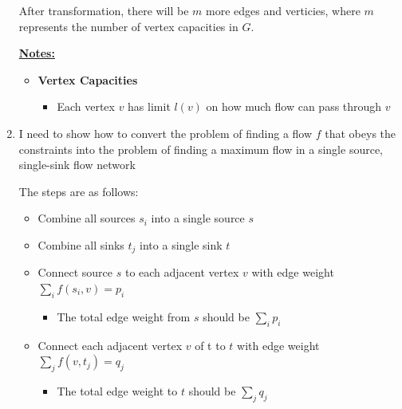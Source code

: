 \documentclass[12pt]{article}
\begin{document}
\begin{enumerate}[1.]
    \bigskip

    After transformation, there will be $m$ more edges and verticies, where $m$
    represents the number of vertex capacities in $G$.

    \bigskip

    \underline{\textbf{Notes:}}

    \bigskip

    \begin{itemize}
        \item \textbf{Vertex Capacities}
        \begin{itemize}
            \item Each vertex $v$ has limit $l(v)$ on how much flow can pass through $v$
        \end{itemize}
    \end{itemize}

    \item

    \bigskip

    I need to show how to convert the problem of finding a flow $f$ that obeys the
    constraints into the problem of finding a maximum flow in a single
    source, single-sink flow network

    \bigskip

    The steps are as follows:

    \bigskip

    \begin{itemize}
        \item Combine all sources $s_i$ into a single source $s$
        \item Combine all sinks $t_j$ into a single sink $t$
        \item Connect source $s$ to each adjacent vertex $v$ with edge weight $\sum\limits_{i} f(s_i, v) = p_i$

        \begin{itemize}
            \item The total edge weight from $s$ should be $\sum\limits_{i} p_i$
        \end{itemize}

        \item Connect each adjacent vertex $v$ of t to $t$ with edge weight $\sum\limits_{j} f(v,t_j) = q_j$

        \begin{itemize}
            \item The total edge weight to $t$ should be $\sum\limits_{j} q_j$
        \end{itemize}



\end{itemize}
\end{enumerate}
\end{document}
